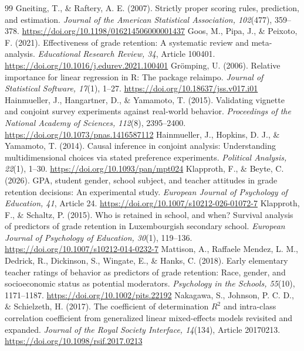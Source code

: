 \begin{thebibliography}{99}
 Gneiting, T., \& Raftery, A. E. (2007). Strictly proper scoring rules, prediction, and estimation. \textit{Journal of the American Statistical Association, 102}(477), 359--378. \url{https://doi.org/10.1198/016214506000001437}
 \color{reused} Goos, M., Pipa, J., \& Peixoto, F. (2021). Effectiveness of grade retention: A systematic review and meta-analysis. \textit{Educational Research Review, 34}, Article 100401. \url{https://doi.org/10.1016/j.edurev.2021.100401}
 \color{reused} Gr\"omping, U. (2006). Relative importance for linear regression in R: The package relaimpo. \textit{Journal of Statistical Software, 17}(1), 1--27. \url{https://doi.org/10.18637/jss.v017.i01}
 Hainmueller, J., Hangartner, D., \& Yamamoto, T. (2015). Validating vignette and conjoint survey experiments against real-world behavior. \textit{Proceedings of the National Academy of Sciences, 112}(8), 2395--2400. \url{https://doi.org/10.1073/pnas.1416587112}
 \color{reused} Hainmueller, J., Hopkins, D. J., \& Yamamoto, T. (2014). Causal inference in conjoint analysis: Understanding multidimensional choices via stated preference experiments. \textit{Political Analysis, 22}(1), 1--30. \url{https://doi.org/10.1093/pan/mpt024}
 \color{reused} Klapproth, F., \& Beyte, C. (2026). GPA, student gender, school subject, and teacher attitudes in grade retention decisions: An experimental study. \textit{European Journal of Psychology of Education, 41}, Article 24. \url{https://doi.org/10.1007/s10212-026-01072-7}
 \color{reused} Klapproth, F., \& Schaltz, P. (2015). Who is retained in school, and when? Survival analysis of predictors of grade retention in Luxembourgish secondary school. \textit{European Journal of Psychology of Education, 30}(1), 119--136. \url{https://doi.org/10.1007/s10212-014-0232-7}
 \color{reused} Mattison, A., Raffaele Mendez, L. M., Dedrick, R., Dickinson, S., Wingate, E., \& Hanks, C. (2018). Early elementary teacher ratings of behavior as predictors of grade retention: Race, gender, and socioeconomic status as potential moderators. \textit{Psychology in the Schools, 55}(10), 1171--1187. \url{https://doi.org/10.1002/pits.22192}
 \color{reused} Nakagawa, S., Johnson, P. C. D., \& Schielzeth, H. (2017). The coefficient of determination $R^2$ and intra-class correlation coefficient from generalized linear mixed-effects models revisited and expanded. \textit{Journal of the Royal Society Interface, 14}(134), Article 20170213. \url{https://doi.org/10.1098/rsif.2017.0213}

\end{thebibliography}
